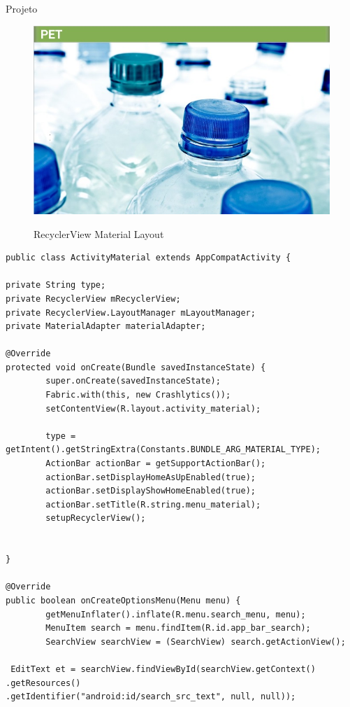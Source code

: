 \documentclass[
	12pt,				%
	openright,			%
	twoside,			%
	a4paper,			%
	english,			%
	french,				%
	spanish,			%
	brazil				%
	]{abntex2}
\begin{document}
\begin{chapter}{Projeto}
\begin{figure}[h]
\centering
   \caption{RecyclerView Material Layout}
   \includegraphics[scale=0.6]{media/tela_material_act_3.jpg}
     \label{fig:include_material}
\end{figure}

\newpage
\begin{lstlisting}[numbers=none,
basicstyle=\small,
caption={ActivityMaterial.java},
title={ActivityMaterial.java},
label={ActivityMaterial.java}]
public class ActivityMaterial extends AppCompatActivity {

private String type;
private RecyclerView mRecyclerView;
private RecyclerView.LayoutManager mLayoutManager;
private MaterialAdapter materialAdapter;

@Override
protected void onCreate(Bundle savedInstanceState) {
		super.onCreate(savedInstanceState);
		Fabric.with(this, new Crashlytics());
		setContentView(R.layout.activity_material);

		type = getIntent().getStringExtra(Constants.BUNDLE_ARG_MATERIAL_TYPE);
		ActionBar actionBar = getSupportActionBar();
		actionBar.setDisplayHomeAsUpEnabled(true);
		actionBar.setDisplayShowHomeEnabled(true);
		actionBar.setTitle(R.string.menu_material);
		setupRecyclerView();


}

@Override
public boolean onCreateOptionsMenu(Menu menu) {
		getMenuInflater().inflate(R.menu.search_menu, menu);
		MenuItem search = menu.findItem(R.id.app_bar_search);
		SearchView searchView = (SearchView) search.getActionView();

 EditText et = searchView.findViewById(searchView.getContext()
.getResources()
.getIdentifier("android:id/search_src_text", null, null));
		

\end{lstlisting}
\end{chapter}
\end{document}
